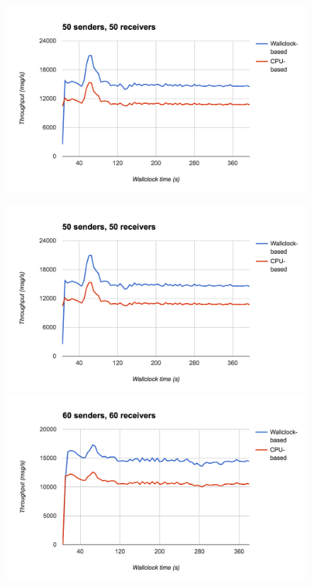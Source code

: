 \documentclass[12pt,a4paper,twoside,openright]{report}
\begin{document}
{\begin{figure}
  \centering\includegraphics[width=\textwidth]{../transcripts/lipsum/50n50/50n50.png}
\end{figure}
\begin{figure}
  \centering\includegraphics[width=\textwidth]{../transcripts/lipsum/50n50/50n50.png}

  \centering\includegraphics[width=\textwidth]{../transcripts/lipsum/60n60/60n60.png}
\end{figure}

}
\end{document}

